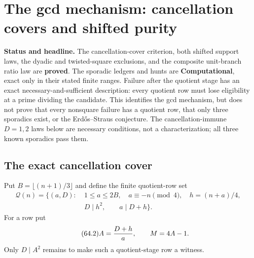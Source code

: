 \documentclass[10pt,reqno]{amsart}
\theoremstyle{definition}
\newcommand{\1}{\mathbf 1}
\begin{document}
\section{The gcd mechanism: cancellation covers and shifted purity}
\label{sec:gcd-mechanism}
\medskip\noindent\textbf{Status and headline.}
The cancellation-cover criterion, both shifted support laws, the dyadic and
twisted-square exclusions, and the composite unit-branch ratio law are
\textbf{proved}.  The sporadic ledgers and hunts are \textbf{Computational},
exact only in their stated finite ranges.  Failure after the quotient stage
has an exact necessary-and-sufficient description: every quotient row must
lose eligibility at a prime dividing the candidate.  This identifies the
gcd mechanism, but does not prove that every nonsquare failure has a quotient
row, that only three sporadics exist, or the Erd\H{o}s--Straus conjecture.
The cancellation-immune $D=1,2$ laws below are necessary conditions, not a
characterization; all three known sporadics pass them.

\subsection{The exact cancellation cover}
Put $B=\lfloor(n+1)/3\rfloor$ and define the finite quotient-row set
\begin{equation}\tag{64.1}
 \begin{split}
 \mathcal Q(n)=\{(a,D):\;&1\leq a\leq2B,\quad a\equiv-n\pmod4,
       \quad h=(n+a)/4,\\
 &D\mid h^2,\qquad a\mid D+h\}.
 \end{split}
\end{equation}
For a row put
\begin{equation}\tag{64.2}
                         A={D+h\over a},\qquad M=4A-1.
\end{equation}
Only $D\mid A^2$ remains to make such a quotient-stage row a witness.
\end{document}
